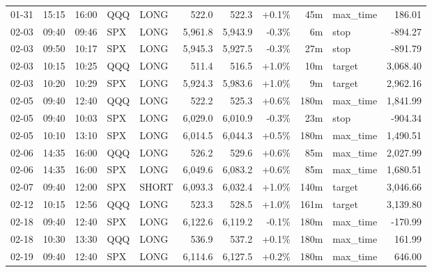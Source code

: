 \documentclass[11pt,a4paper,twoside]{article}
\begin{document}
\begin{center}
\begin{longtable}{>{\color{txtmain}}l l l l l r r r r >{\color{txtmain}}l r}
01-31 & 15:15 & 16:00 & QQQ & LONG & 522.0 & 522.3 & \textcolor{wingreen}{+0.1\%} & 45m & max\_time & \textcolor{wingreen}{186.01} \\
02-03 & 09:40 & 09:46 & SPX & LONG & 5,961.8 & 5,943.9 & \textcolor{lossred}{-0.3\%} & 6m & stop & \textcolor{lossred}{-894.27} \\
02-03 & 09:50 & 10:17 & SPX & LONG & 5,945.3 & 5,927.5 & \textcolor{lossred}{-0.3\%} & 27m & stop & \textcolor{lossred}{-891.79} \\
02-03 & 10:15 & 10:25 & QQQ & LONG & 511.4 & 516.5 & \textcolor{wingreen}{+1.0\%} & 10m & target & \textcolor{wingreen}{3,068.40} \\
02-03 & 10:20 & 10:29 & SPX & LONG & 5,924.3 & 5,983.6 & \textcolor{wingreen}{+1.0\%} & 9m & target & \textcolor{wingreen}{2,962.16} \\
02-05 & 09:40 & 12:40 & QQQ & LONG & 522.2 & 525.3 & \textcolor{wingreen}{+0.6\%} & 180m & max\_time & \textcolor{wingreen}{1,841.99} \\
02-05 & 09:40 & 10:03 & SPX & LONG & 6,029.0 & 6,010.9 & \textcolor{lossred}{-0.3\%} & 23m & stop & \textcolor{lossred}{-904.34} \\
02-05 & 10:10 & 13:10 & SPX & LONG & 6,014.5 & 6,044.3 & \textcolor{wingreen}{+0.5\%} & 180m & max\_time & \textcolor{wingreen}{1,490.51} \\
02-06 & 14:35 & 16:00 & QQQ & LONG & 526.2 & 529.6 & \textcolor{wingreen}{+0.6\%} & 85m & max\_time & \textcolor{wingreen}{2,027.99} \\
02-06 & 14:35 & 16:00 & SPX & LONG & 6,049.6 & 6,083.2 & \textcolor{wingreen}{+0.6\%} & 85m & max\_time & \textcolor{wingreen}{1,680.51} \\
02-07 & 09:40 & 12:00 & SPX & SHORT & 6,093.3 & 6,032.4 & \textcolor{wingreen}{+1.0\%} & 140m & target & \textcolor{wingreen}{3,046.66} \\
02-12 & 10:15 & 12:56 & QQQ & LONG & 523.3 & 528.5 & \textcolor{wingreen}{+1.0\%} & 161m & target & \textcolor{wingreen}{3,139.80} \\
02-18 & 09:40 & 12:40 & SPX & LONG & 6,122.6 & 6,119.2 & \textcolor{lossred}{-0.1\%} & 180m & max\_time & \textcolor{lossred}{-170.99} \\
02-18 & 10:30 & 13:30 & QQQ & LONG & 536.9 & 537.2 & \textcolor{wingreen}{+0.1\%} & 180m & max\_time & \textcolor{wingreen}{161.99} \\
02-19 & 09:40 & 12:40 & SPX & LONG & 6,114.6 & 6,127.5 & \textcolor{wingreen}{+0.2\%} & 180m & max\_time & \textcolor{wingreen}{646.00} \\

\end{longtable}
\end{center}
\end{document}
